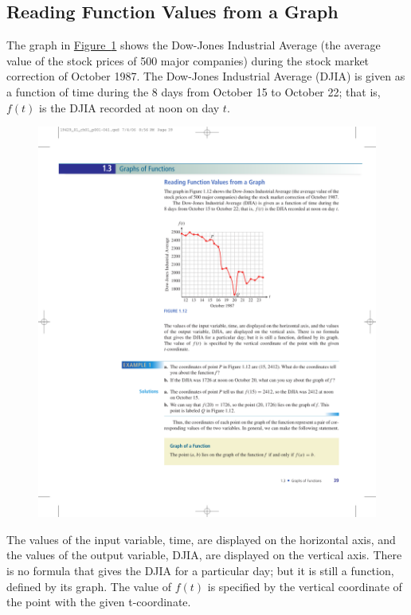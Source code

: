 \documentclass[10pt,]{book}
\theoremstyle{plain}
\theoremstyle{definition}
\theoremstyle{definition}
\theoremstyle{definition}
\theoremstyle{definition}
\numberwithin{equation}{part}
\begin{document}
\subsection[{Reading Function Values from a Graph}]{Reading Function Values from a Graph}\label{subsection-15}
The graph in \hyperref[fig-DJIA]{Figure~\ref{fig-DJIA}}  shows the Dow-Jones Industrial Average (the average value of the stock prices of 500 major companies) during the stock market correction of October 1987. The Dow-Jones Industrial Average (DJIA) is given as a function of time during the 8 days from October 15 to October 22; that is, \(f(t)\) is the DJIA recorded at noon on day \(t\).%
\begin{figure}
\centering
\includegraphics[width=0.8\linewidth]{images/fig-DJIA}
\caption{\label{fig-DJIA}}
\end{figure}
The values of the input variable, time, are displayed on the horizontal axis, and the values of the output variable, DJIA, are displayed on the vertical axis. There is no formula that gives the DJIA for a particular day; but it is still a function, defined by its graph. The value of \(f(t)\) is specified by the vertical coordinate of the point with the given t-coordinate.%
\end{document}
